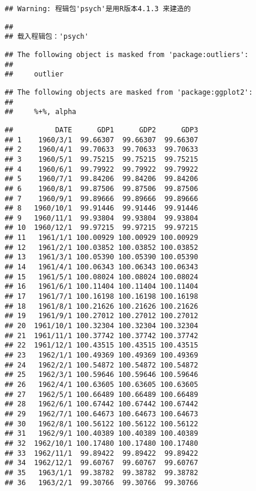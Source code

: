 \documentclass[
]{article}
\begin{document}
\begin{verbatim}
## Warning: 程辑包'psych'是用R版本4.1.3 来建造的
\end{verbatim}

\begin{verbatim}
## 
## 载入程辑包：'psych'
\end{verbatim}

\begin{verbatim}
## The following object is masked from 'package:outliers':
## 
##     outlier
\end{verbatim}

\begin{verbatim}
## The following objects are masked from 'package:ggplot2':
## 
##     %+%, alpha
\end{verbatim}

\begin{verbatim}
##          DATE      GDP1      GDP2      GDP3
## 1    1960/3/1  99.66307  99.66307  99.66307
## 2    1960/4/1  99.70633  99.70633  99.70633
## 3    1960/5/1  99.75215  99.75215  99.75215
## 4    1960/6/1  99.79922  99.79922  99.79922
## 5    1960/7/1  99.84206  99.84206  99.84206
## 6    1960/8/1  99.87506  99.87506  99.87506
## 7    1960/9/1  99.89666  99.89666  99.89666
## 8   1960/10/1  99.91446  99.91446  99.91446
## 9   1960/11/1  99.93804  99.93804  99.93804
## 10  1960/12/1  99.97215  99.97215  99.97215
## 11   1961/1/1 100.00929 100.00929 100.00929
## 12   1961/2/1 100.03852 100.03852 100.03852
## 13   1961/3/1 100.05390 100.05390 100.05390
## 14   1961/4/1 100.06343 100.06343 100.06343
## 15   1961/5/1 100.08024 100.08024 100.08024
## 16   1961/6/1 100.11404 100.11404 100.11404
## 17   1961/7/1 100.16198 100.16198 100.16198
## 18   1961/8/1 100.21626 100.21626 100.21626
## 19   1961/9/1 100.27012 100.27012 100.27012
## 20  1961/10/1 100.32304 100.32304 100.32304
## 21  1961/11/1 100.37742 100.37742 100.37742
## 22  1961/12/1 100.43515 100.43515 100.43515
## 23   1962/1/1 100.49369 100.49369 100.49369
## 24   1962/2/1 100.54872 100.54872 100.54872
## 25   1962/3/1 100.59646 100.59646 100.59646
## 26   1962/4/1 100.63605 100.63605 100.63605
## 27   1962/5/1 100.66489 100.66489 100.66489
## 28   1962/6/1 100.67442 100.67442 100.67442
## 29   1962/7/1 100.64673 100.64673 100.64673
## 30   1962/8/1 100.56122 100.56122 100.56122
## 31   1962/9/1 100.40389 100.40389 100.40389
## 32  1962/10/1 100.17480 100.17480 100.17480
## 33  1962/11/1  99.89422  99.89422  99.89422
## 34  1962/12/1  99.60767  99.60767  99.60767
## 35   1963/1/1  99.38782  99.38782  99.38782
## 36   1963/2/1  99.30766  99.30766  99.30766

\end{verbatim}
\end{document}
